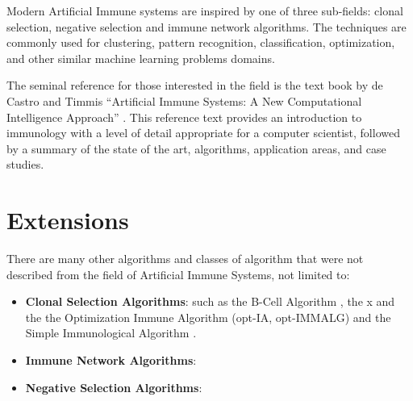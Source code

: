 \begin{bibunit}
Modern Artificial Immune systems are inspired by one of three sub-fields: clonal selection, negative selection and immune network algorithms. The techniques are commonly used for clustering, pattern recognition, classification, optimization, and other similar machine learning problems domains.

The seminal reference for those interested in the field is the text book by de Castro and Timmis ``Artificial Immune Systems: A New Computational Intelligence Approach'' \cite{Castro2002}. This reference text provides an introduction to immunology with a level of detail appropriate for a computer scientist, followed by a summary of the state of the art, algorithms, application areas, and case studies.

% 
% 
\section{Extensions}
There are many other algorithms and classes of algorithm that were not described from the field of Artificial Immune Systems, not limited to:

\begin{itemize}
	\item \textbf{Clonal Selection Algorithms}: such as the B-Cell Algorithm \cite{Kelsey2003}, the x and the the Optimization Immune Algorithm (opt-IA, opt-IMMALG) \cite{Cutello2002a, Cutello2002} and the Simple Immunological Algorithm \cite{Cutello2005b}.
	\item \textbf{Immune Network Algorithms}:
	\item \textbf{Negative Selection Algorithms}:
\end{itemize}


\putbib
\end{bibunit}

\newpage\begin{bibunit}\putbib\end{bibunit}
\newpage\begin{bibunit}\putbib\end{bibunit}
\newpage\begin{bibunit}\putbib\end{bibunit}
\newpage\begin{bibunit}\putbib\end{bibunit}
\newpage\begin{bibunit}\putbib\end{bibunit}
